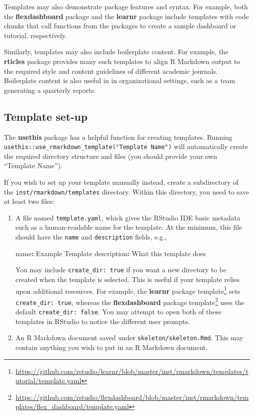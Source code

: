 \documentclass[
  11pt,
]{krantz}
\newenvironment{Shaded}{\begin{snugshade}}{\end{snugshade}}
\newcommand{\AttributeTok}[1]{\textcolor[rgb]{0.61,0.61,0.61}{#1}}
\newcommand{\FunctionTok}[1]{\textcolor[rgb]{0,0,0}{#1}}
\newcommand{\KeywordTok}[1]{\textcolor[rgb]{0.27,0.27,0.27}{\textbf{#1}}}
\renewcommand{\href}[2]{#2\footnote{\url{#1}}}
\begin{document}
Templates may also demonstrate package features and syntax. For example, both the \textbf{flexdashboard} package and the \textbf{learnr} package include templates with code chunks that call functions from the packages to create a sample dashboard or tutorial, respectively.

Similarly, templates may also include boilerplate content. For example, the \textbf{rticles} package provides many such templates to align R Markdown output to the required style and content guidelines of different academic journals. Boilerplate content is also useful in in organizational settings, such as a team generating a quarterly reports.

\hypertarget{template-set-up}{%
\subsection{Template set-up}\label{template-set-up}}

The \textbf{usethis} package has a helpful function for creating templates. Running \texttt{usethis::use\_rmarkdown\_template("Template\ Name")} will automatically create the required directory structure and files (you should provide your own ``Template Name'').

If you wish to set up your template manually instead, create a subdirectory of the \texttt{inst/rmarkdown/templates} directory. Within this directory, you need to save at least two files:

\begin{enumerate}
\def\labelenumi{\arabic{enumi}.}
\item
  A file named \texttt{template.yaml}, which gives the RStudio IDE basic metadata such as a human-readable name for the template. At the minimum, this file should have the \texttt{name} and \texttt{description} fields, e.g.,

\begin{Shaded}
\begin{Highlighting}[]
\FunctionTok{name}\KeywordTok{:}\AttributeTok{ Example Template}
\FunctionTok{description}\KeywordTok{:}\AttributeTok{ What this template does}
\end{Highlighting}
\end{Shaded}

  You may include \texttt{create\_dir:\ true} if you want a new directory to be created when the template is selected. This is useful if your template relies upon additional resources. For example, the \href{https://github.com/rstudio/learnr/blob/master/inst/rmarkdown/templates/tutorial/template.yaml}{\textbf{learnr} package template} sets \texttt{create\_dir:\ true}, whereas the \href{https://github.com/rstudio/flexdashboard/blob/master/inst/rmarkdown/templates/flex_dashboard/template.yaml}{\textbf{flexdashboard} package template} uses the default \texttt{create\_dir:\ false}. You may attempt to open both of these templates in RStudio to notice the different user prompts.
\item
  An R Markdown document saved under \texttt{skeleton/skeleton.Rmd}. This may contain anything you wish to put in an R Markdown document.
\end{enumerate}
\end{document}
